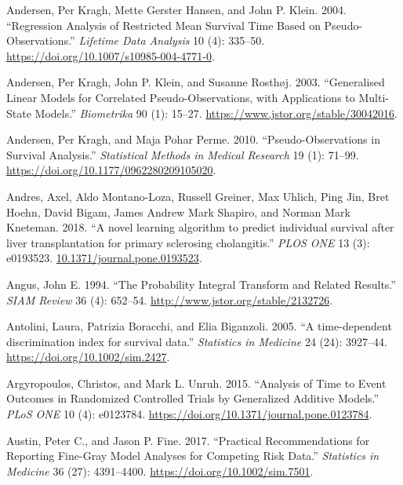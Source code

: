 \documentclass[
  letterpaper,
  krantz2]{style/krantz}
\newlength{\cslhangindent}
\newenvironment{CSLReferences}[2] %
 {\begin{list}{}{%
  \setlength{\itemindent}{0pt}
  \setlength{\leftmargin}{0pt}
  \setlength{\parsep}{0pt}
  \ifodd #1
   \setlength{\leftmargin}{\cslhangindent}
   \setlength{\itemindent}{-1\cslhangindent}
  \fi
  \setlength{\itemsep}{#2\baselineskip}}}
 {\end{list}}
\begin{document}
\begin{CSLReferences}{1}{0}
Andersen, Per Kragh, Mette Gerster Hansen, and John P. Klein. 2004.
{``Regression {Analysis} of {Restricted Mean Survival Time Based} on
{Pseudo-Observations}.''} \emph{Lifetime Data Analysis} 10 (4): 335--50.
\url{https://doi.org/10.1007/s10985-004-4771-0}.

Andersen, Per Kragh, John P. Klein, and Susanne Rosthøj. 2003.
{``Generalised {Linear Models} for {Correlated Pseudo-Observations},
with {Applications} to {Multi-State Models}.''} \emph{Biometrika} 90
(1): 15--27. \url{https://www.jstor.org/stable/30042016}.

Andersen, Per Kragh, and Maja Pohar Perme. 2010. {``Pseudo-Observations
in Survival Analysis.''} \emph{Statistical Methods in Medical Research}
19 (1): 71--99. \url{https://doi.org/10.1177/0962280209105020}.

Andres, Axel, Aldo Montano-Loza, Russell Greiner, Max Uhlich, Ping Jin,
Bret Hoehn, David Bigam, James Andrew Mark Shapiro, and Norman Mark
Kneteman. 2018. {``{A novel learning algorithm to predict individual
survival after liver transplantation for primary sclerosing
cholangitis}.''} \emph{PLOS ONE} 13 (3): e0193523.
\href{https://10.1371/journal.pone.0193523}{10.1371/journal.pone.0193523}.

Angus, John E. 1994. {``The Probability Integral Transform and Related
Results.''} \emph{SIAM Review} 36 (4): 652--54.
\url{http://www.jstor.org/stable/2132726}.

Antolini, Laura, Patrizia Boracchi, and Elia Biganzoli. 2005. {``{A
time-dependent discrimination index for survival data}.''}
\emph{Statistics in Medicine} 24 (24): 3927--44.
\url{https://doi.org/10.1002/sim.2427}.

Argyropoulos, Christos, and Mark L. Unruh. 2015. {``Analysis of {Time}
to {Event Outcomes} in {Randomized Controlled Trials} by {Generalized
Additive Models}.''} \emph{PLoS ONE} 10 (4): e0123784.
\url{https://doi.org/10.1371/journal.pone.0123784}.

Austin, Peter C., and Jason P. Fine. 2017. {``Practical Recommendations
for Reporting Fine-Gray Model Analyses for Competing Risk Data.''}
\emph{Statistics in Medicine} 36 (27): 4391--4400.
\url{https://doi.org/10.1002/sim.7501}.


\end{CSLReferences}
\end{document}
